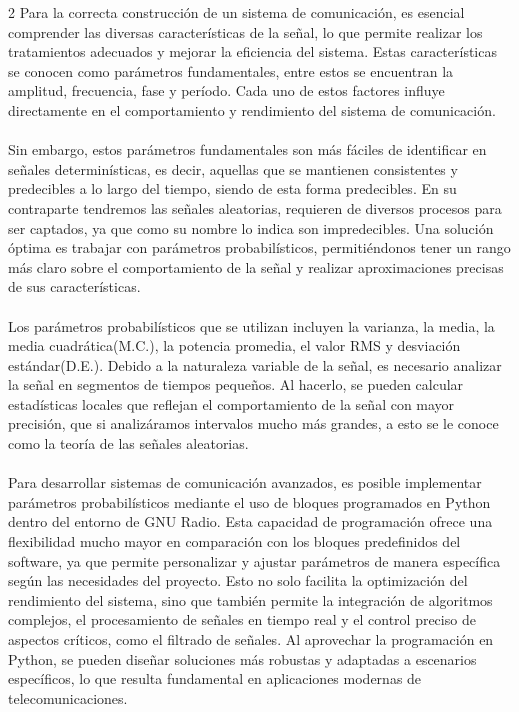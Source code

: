 \documentclass{journal}[IEEEtran, twocolumn]
\begin{document}
\begin{multicols}{2}
Para la correcta construcción de un sistema de comunicación, es esencial comprender las diversas características de la señal, lo que permite realizar los tratamientos adecuados y mejorar la eficiencia del sistema. Estas características se conocen como parámetros fundamentales, entre estos se encuentran la amplitud, frecuencia, fase y período. Cada uno de estos factores influye directamente en el comportamiento y rendimiento del sistema de comunicación\cite{Ortega2019}.\\\\
\noindent
Sin embargo, estos parámetros fundamentales son más fáciles de identificar en señales determinísticas, es decir, aquellas que se mantienen consistentes y predecibles a lo largo del tiempo, siendo de esta forma predecibles. En su contraparte tendremos las señales aleatorias, requieren de diversos procesos para ser captados, ya que como su nombre lo indica son impredecibles. Una solución óptima es trabajar con parámetros probabilísticos, permitiéndonos tener un rango más claro sobre el comportamiento de la señal y realizar aproximaciones precisas de sus características\cite{YangSung}.\\\\
\noindent
Los parámetros probabilísticos que se utilizan incluyen la varianza, la media, la media cuadrática(M.C.), la potencia promedia, el valor RMS y desviación estándar(D.E.). Debido a la naturaleza variable de la señal, es necesario analizar la señal en segmentos de tiempos pequeños. Al hacerlo, se pueden calcular estadísticas locales que reflejan el comportamiento de la señal con mayor precisión, que si analizáramos intervalos mucho más grandes, a esto se le conoce como la teoría de las señales aleatorias\cite{YangSung}.\\\\
\noindent
Para desarrollar sistemas de comunicación avanzados, es posible implementar parámetros probabilísticos mediante el uso de bloques programados en Python dentro del entorno de GNU Radio. Esta capacidad de programación ofrece una flexibilidad mucho mayor en comparación con los bloques predefinidos del software, ya que permite personalizar y ajustar parámetros de manera específica según las necesidades del proyecto. Esto no solo facilita la optimización del rendimiento del sistema, sino que también permite la integración de algoritmos complejos, el procesamiento de señales en tiempo real y el control preciso de aspectos críticos, como el filtrado de señales. Al aprovechar la programación en Python, se pueden diseñar soluciones más robustas y adaptadas a escenarios específicos, lo que resulta fundamental en aplicaciones modernas de telecomunicaciones\cite{Ortega2019}.


\end{multicols}
\end{document}
